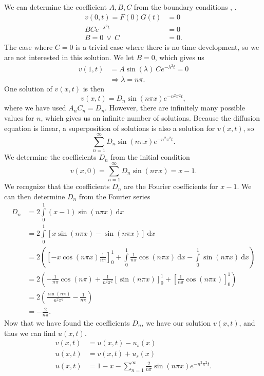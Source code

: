 %
We can determine the coefficient $A,B,C$ from the boundary conditions
, .
%
\begin{align*}
	v(0,t) = F(0)G(t) &= 0 \\
	BCe^{-\lambda^2 t} &= 0 \\
	B = 0 \ \vee \ C &= 0.
\end{align*}
%
The case where $C = 0$ is a trivial case where there is no time development, so 
we are not interested in this solution. We let $B = 0$, which gives us
%
\begin{align*}
	v(1,t) &= A\sin{(\lambda)} \ Ce^{-\lambda^2 t} = 0 \\
	&\Rightarrow \lambda = n\pi.
\end{align*}
%
One solution of $v(x,t)$ is then
%
\begin{equation*}
	v(x,t) =  D_n\sin{(n\pi x)}e^{-n^2\pi^2 t},
\end{equation*}
%
where we have used $A_nC_n = D_n$.
However, there are infinitely many possible values for $n$, which gives us an
infinite number of solutions. Because the diffusion equation is linear, a
superposition of solutions is also a solution for $v(x,t)$, so
%
\begin{equation*}
	\sum\limits_{n=1}^{\infty} D_n\sin{(n\pi x)}e^{-n^2\pi^2 t}.
\end{equation*}
%
We determine the coefficients $D_n$ from the initial condition
%
\begin{equation*}
	v(x,0) = \sum\limits_{n=1}^{\infty} D_n\sin{(n\pi x)} = x - 1.
\end{equation*}
%
We recognize that the coefficients $D_n$ are the Fourier coefficients for
$x - 1$. We can then determine $D_n$ from the Fourier series
%
\begin{align*}
	D_n &= 2\int\limits_0^1 (x - 1)\sin{(n\pi x)} \ \mathrm{d}x \\
	&= 2 \int\limits_0^1 \left[ x\sin{(n\pi x)} - \sin{(n\pi x)} \right] \
	\mathrm{d}x \\
	&= 2 \left( \left[ -x\cos{(n\pi x)}\frac{1}{n\pi} \right]_0^1 
	+ \int\limits_0^1\frac{1}{n\pi}\cos{(n\pi x)} \ \mathrm{d}x - \int\limits_0^1
	\sin{(n\pi x)} \ \mathrm{d}x \right) \\
	&= 2 \left( -\frac{1}{n\pi}\cos{(n\pi)} + \frac{1}{n^2\pi^2}\left[
		\sin{(n\pi x)}
	\right]_0^1 + \left[ \frac{1}{n\pi}\cos{(n\pi x)} \right]_0^1
	\right) \\
	&= 2 \left( \frac{\sin{(n\pi)}}{n^2\pi^2} - \frac{1}{n\pi} \right) \\
	&= -\frac{2}{n\pi}.
\end{align*}
%
Now that we have found the coefficients $D_n$, we have our solution $v(x,t)$,
and thus we can find $u(x,t)$.
%
\begin{align*}
	v(x,t) &= u(x,t) - u_s(x) \\
	u(x,t) &= v(x,t) + u_s(x) \\
	u(x,t) &= 1 - x - \sum\limits_{n=1}^{\infty}
	\frac{2}{n\pi}\sin{(n\pi x)}e^{-n^2\pi^2 t}.
\end{align*}
%
